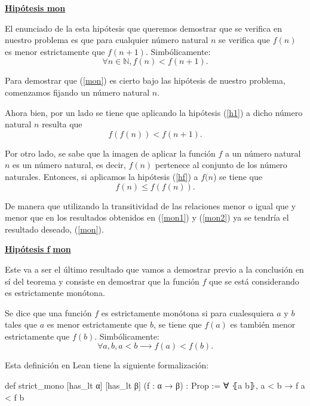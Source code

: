 \begin{demostracion}
  \noindent
  \textbf{\underline{Hipótesis mon}}

  El enunciado de la esta hipótesis que queremos demostrar que se
  verifica en nuestro problema es que para cualquier número natural
  \(n\) se verifica que \(f(n)\) es menor estrictamente que \(f(n+1)\).
  Simbólicamente:
  \begin{equation}\label{mon}\tag{mon}
    ∀n∈ ℕ, f(n)<f(n+1).
  \end{equation}

  Para demostrar que (\ref{mon}) es cierto bajo las hipótesis de nuestro
  problema, comenzamos fijando un número natural \(n\).

  Ahora bien, por un lado se tiene que aplicando la hipótesis (\ref{h1})
  a dicho número natural \(n\) resulta que
  \begin{equation}\label{mon1}
    f(f(n))<f(n+1).
  \end{equation}

  Por otro lado, se sabe que la imagen de aplicar la función \(f\) a un
  número natural \(n\) es un número natural, es decir, \(f(n)\) pertenece
  al conjunto de los número naturales. Entonces, si aplicamos la
  hipótesis (\ref{hf}) a \(f(n\)) se tiene que
  \begin{equation}\label{mon2}
    f(n)≤f(f(n)).
  \end{equation}

  De manera que utilizando la transitividad de las relaciones menor o
  igual que y menor que en los resultados obtenidos en (\ref{mon1}) y
  (\ref{mon2}) ya se tendría el resultado deseado, (\ref{mon}).

  \noindent
  \textbf{\underline{Hipótesis f\(\_\)mon}}

  Este va a ser el último resultado que vamos a demostrar previo a la
  conclusión en sí del teorema y consiste en demostrar que la función
  \(f\) que se está considerando es estrictamente monótona.

  \begin{definicion}\label{def:mono}
    Se dice que una función \(f\) es estrictamente monótona si para
    cualesquiera \(a\) y \(b\) tales que \(a\) es menor estrictamente que
    \(b\), se tiene que \(f(a)\) es también menor estrictamente que
    \(f(b)\). Simbólicamente:
    \begin{equation}
      ∀a,b, a<b ⟶ f(a)<f(b).
    \end{equation}
  \end{definicion}

  Esta definición en Lean tiene la siguiente formalización:
  \begin{leancode}
    def strict_mono [has_lt α] [has_lt β] (f : α → β) : Prop :=
    ∀ ⦃a b⦄, a < b → f a < f b
  \end{leancode}


\end{demostracion}
